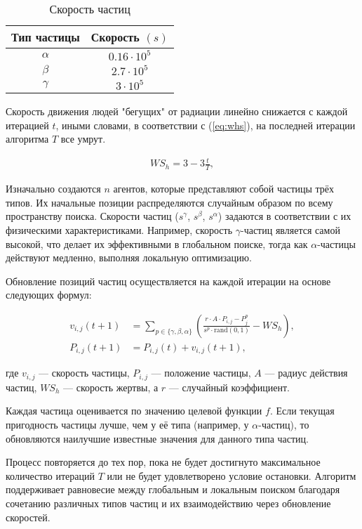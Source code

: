 \documentclass[10pt]{article}
\begin{document}
 \begin{table}[htbp]
     \centering
     \begin{tabular}{cc}
        Тип частицы  &  Скорость ${(s)}$\\
        \hline
          $\alpha$ & $0.16\cdot10^5$ \\
          $\beta$  & $2.7\cdot10^5$ \\
          $\gamma$  & $3\cdot10^5$
     \end{tabular}
     \caption{Скорость частиц}
     \label{tab:pSpeed}
 \end{table}

Скорость движения людей "бегущих" от радиации линейно снижается с каждой итерацией $t$, иными словами, в соответствии с (\ref{eq:whs}), на последней итерации алгоритма $T$ все умрут.

\begin{align}
    WS_h = 3 - 3\frac{t}{T},
    \label{eq:whs}
\end{align}

Изначально создаются $n$ агентов, которые представляют собой частицы трёх типов. Их начальные позиции распределяются случайным образом по всему пространству поиска. Скорости частиц ($s^{\gamma}$, $s^{\beta}$, $s^{\alpha}$) задаются в соответствии с их физическими характеристиками. Например, скорость $\gamma$-частиц является самой высокой, что делает их эффективными в глобальном поиске, тогда как $\alpha$-частицы действуют медленно, выполняя локальную оптимизацию.

Обновление позиций частиц осуществляется на каждой итерации на основе следующих формул:

\begin{align}
    v_{i,j}(t+1) &= \sum_{p \in \{\gamma, \beta, \alpha\}} \left(\frac{r \cdot A \cdot P_{i,j} - P^{p}_j}{s^p \cdot \text{rand}(0,1)} - WS_h\right), 
    \label{eq:v}\\
    P_{i,j}(t+1) &= P_{i,j}(t) + v_{i,j}(t+1),
    \label{eq:pos}
\end{align}

где $v_{i,j}$ — скорость частицы, $P_{i,j}$ — положение частицы, $A$ — радиус действия частиц, $WS_h$ — скорость жертвы, а $r$ — случайный коэффициент.

Каждая частица оценивается по значению целевой функции $f$. Если текущая пригодность частицы лучше, чем у её типа (например, у $\alpha$-частиц), то обновляются наилучшие известные значения для данного типа частиц.

Процесс повторяется до тех пор, пока не будет достигнуто максимальное количество итераций $T$ или не будет удовлетворено условие остановки. Алгоритм поддерживает равновесие между глобальным и локальным поиском благодаря сочетанию различных типов частиц и их взаимодействию через обновление скоростей.
\end{document}
